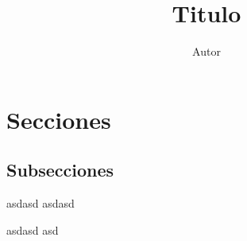 \documentclass[12pt]{article}
\title{Titulo}
\author{Autor}
\begin{document}
\maketitle

\section{Secciones}
\subsection{Subsecciones}

asdasd asdasd

asdasd
asd
\end{document}
